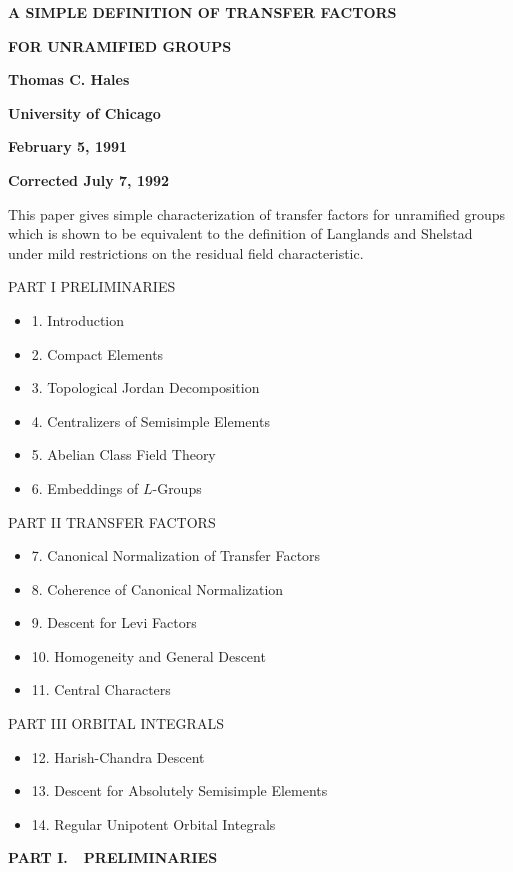 \documentclass[11pt]{amsart}
\theoremstyle{plain}
\theoremstyle{definition}
\begin{document}
\centerline{\bf A SIMPLE DEFINITION OF TRANSFER FACTORS}
\centerline{\bf FOR UNRAMIFIED GROUPS}\vskip6pc
\baselineskip=10pt
\centerline{\bf Thomas C. Hales}\vskip1pc
\centerline{\bf University of Chicago}\vskip1pc
\centerline{\bf February 5, 1991}\vskip1pc
\centerline{\bf Corrected July 7, 1992}\vskip6pc


{
\narrower
{}\baselineskip
{}\qquad  This paper gives simple characterization
of transfer factors for unramified groups which is shown to be equivalent
to the definition of Langlands and Shelstad  under mild restrictions on the
residual field characteristic.
}
\vfil\eject

\baselineskip

\noindent PART I PRELIMINARIES\smallskip
\begin{itemize}
\item{1.}  Introduction
\item{2.}  Compact Elements
\item{3.}  Topological Jordan Decomposition
\item{4.}  Centralizers of Semisimple Elements
\item{5.}  Abelian Class Field Theory
\item{6.}  Embeddings of $L$-Groups\medskip
\end{itemize}

\noindent PART II  TRANSFER FACTORS\smallskip

\begin{itemize}
\item{7.}  Canonical Normalization of Transfer Factors
\item{8.}  Coherence of Canonical Normalization
\item{9.}  Descent for Levi Factors
\item{10.}  Homogeneity and General Descent
\item{11.}  Central Characters\medskip
\end{itemize}


\noindent PART III  ORBITAL INTEGRALS\smallskip

\begin{itemize}
\item{12.}  Harish-Chandra Descent
\item{13.}  Descent for Absolutely Semisimple Elements
\item{14.}  Regular Unipotent Orbital Integrals
\end{itemize}
\vfil\eject

\centerline{\bf PART I.\ \  PRELIMINARIES}\vskip3pc
\end{document}

